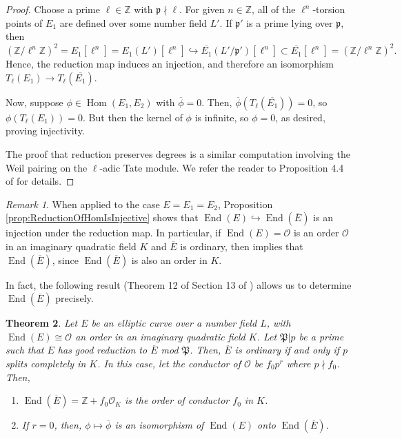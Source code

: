 \documentclass{amsart}
\newtheorem{thm}{Theorem}[section]
\theoremstyle{definition}
\theoremstyle{remark}
\newtheorem{remark}[thm]{Remark}
\numberwithin{equation}{section}
\newcommand{\cO}{\mathcal O}
\newcommand{\fkp}{\mathfrak p}
\newcommand{\fkP}{\mathfrak{P}}
\newcommand{\bbZ}{\mathbb Z}
\DeclareMathOperator{\End}{End}
\DeclareMathOperator{\Hom}{Hom}
\begin{document}
\begin{proof}
Choose a prime $\ell \in \bbZ$ with $\fkp \nmid \ell$. For given $n \in \bbZ$, all of the $\ell^n$-torsion points of $E_{1}$ are defined over some number field $L'$. If $\fkp'$ is a prime lying over $\fkp$, then 
\[
(\bbZ/\ell^n\bbZ)^2 = E_1[\ell^n] = E_1(L')[\ell^n] \hookrightarrow \overline{E_{1}}(L'/\fkp')[\ell^n] \subset \overline{E_{1}}[\ell^n] = (\bbZ/\ell^n\bbZ)^2.
\]
Hence, the reduction map induces an injection, and therefore an isomorphism $T_{\ell}(E_{1}) \to T_{\ell}(\overline{E_{1}})$.

Now, suppose $\phi \in \Hom(E_{1}, E_{2})$ with $\overline{\phi} = 0$. Then, $\overline{\phi}(T_{\ell}(\overline{E_{1}})) = 0$, so $\phi(T_{\ell}(E_{1})) = 0$. But then the kernel of $\phi$ is infinite, so $\phi = 0$, as desired, proving injectivity.

The proof that reduction preserves degrees is a similar computation involving the Weil pairing on the $\ell$-adic Tate module. We refer the reader to Proposition 4.4 of \cite{SilvermanATAEC} for details.
\end{proof}

\begin{remark} \label{rem:ReductionOfEndIsInjective}
When applied to the case $E = E_{1} = E_{2}$, Proposition \ref{prop:ReductionOfHomIsInjective} shows that $\End(E) \hookrightarrow \End(\overline{E})$ is an injection under the reduction map. In particular, if $\End(E) = \cO$ is an order $\cO$ in an imaginary quadratic field $K$ and $\overline{E}$ is ordinary, then implies that $\End(\overline{E})$, since $\End(\overline{E})$ is also an order in $K$.
\end{remark}

In fact, the following result (Theorem 12 of Section 13 of \cite{LangEF}) allows us to determine $\End(\overline{E})$ precisely. 

\begin{thm}\label{thm:ReductionIsNice}
Let $E$ be an elliptic curve over a number field $L$, with $\End(E) \cong \cO$ an order in an imaginary quadratic field $K$. Let $\fkP|p$ be a prime such that $E$ has good reduction to $\overline{E}$ mod $\fkP$. Then, $\overline{E}$ is ordinary if and only if $p$ splits completely in $K$. In this case, let the conductor of $\cO$ be $f_0 p^r$ where $p \nmid f_0$. Then,
\begin{enumerate}
\item $\End(\overline{E}) = \bbZ + f_{0} \cO_{K}$ is the order of conductor $f_{0}$ in $K$.
\item If $r = 0$, then, $\phi \mapsto \overline{\phi}$ is an isomorphism of $\End(E)$ onto $\End(\overline{E})$.
\end{enumerate}
\end{thm}
\end{document}
